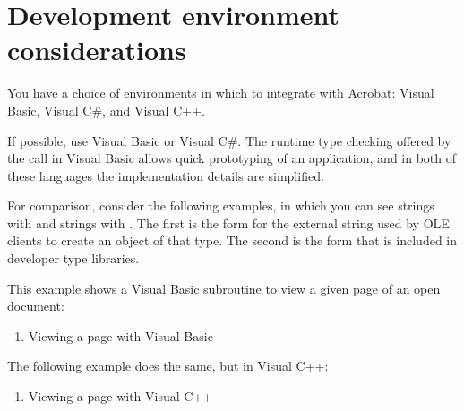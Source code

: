 \documentclass[letterpaper,12pt,english,openany,oneside]{sphinxmanual}
\begin{document}
\section{Development environment considerations}
\label{\detokenize{IAC_DevApp_OLE_Support:development-environment-considerations}}
You have a choice of environments in which to integrate with Acrobat: Visual Basic, Visual C\#, and Visual C++.

If possible, use Visual Basic or Visual C\#. The run\sphinxhyphen{}time type checking offered by the  call in Visual Basic allows quick prototyping of an application, and in both of these languages the implementation details are simplified.

For comparison, consider the following examples, in which you can see strings with  and strings with . The first is the form for the external string used by OLE clients to create an object of that type. The second is the form that is included in developer type libraries.

This example shows a Visual Basic subroutine to view a given page of an open document:
\begin{enumerate}
%
\item {} 
Viewing a page with Visual Basic

\end{enumerate}

\begin{sphinxVerbatim}[commandchars=\\\{\}]
     
             
       
       
       
 
\end{sphinxVerbatim}

The following example does the same, but in Visual C++:
\begin{enumerate}
%
\item {} 
Viewing a page with Visual C++

\end{enumerate}
\end{document}
